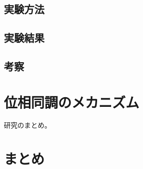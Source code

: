\documentclass[11pt,a4j]{jreport}
\begin{document}
\section{実験方法}
\section{実験結果}
\section{考察}

\chapter{位相同調のメカニズム}
研究のまとめ。

\chapter{まとめ}





\renewcommand{\bibname}{参考文献} %
\end{document}
